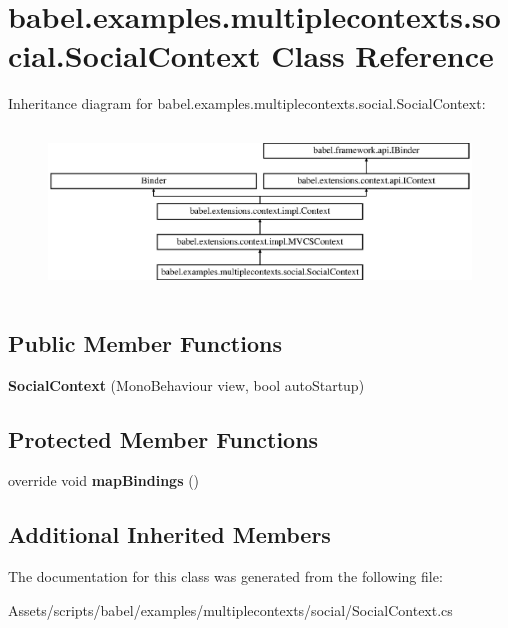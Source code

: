 \hypertarget{classbabel_1_1examples_1_1multiplecontexts_1_1social_1_1_social_context}{\section{babel.\-examples.\-multiplecontexts.\-social.\-Social\-Context Class Reference}
\label{classbabel_1_1examples_1_1multiplecontexts_1_1social_1_1_social_context}
}
Inheritance diagram for babel.\-examples.\-multiplecontexts.\-social.\-Social\-Context\-:\begin{figure}[H]
\begin{center}
\leavevmode
\includegraphics[height=4.416404cm]{classbabel_1_1examples_1_1multiplecontexts_1_1social_1_1_social_context}
\end{center}
\end{figure}
\subsection*{Public Member Functions}
\begin{DoxyCompactItemize}
\item 
\hypertarget{classbabel_1_1examples_1_1multiplecontexts_1_1social_1_1_social_context_ae0b423754ed7adb7a571b83b3a751940}{{\bfseries Social\-Context} (Mono\-Behaviour view, bool auto\-Startup)}\label{classbabel_1_1examples_1_1multiplecontexts_1_1social_1_1_social_context_ae0b423754ed7adb7a571b83b3a751940}

\end{DoxyCompactItemize}
\subsection*{Protected Member Functions}
\begin{DoxyCompactItemize}
\item 
\hypertarget{classbabel_1_1examples_1_1multiplecontexts_1_1social_1_1_social_context_ab889a619838a761bab0c210fd5d31fb2}{override void {\bfseries map\-Bindings} ()}\label{classbabel_1_1examples_1_1multiplecontexts_1_1social_1_1_social_context_ab889a619838a761bab0c210fd5d31fb2}

\end{DoxyCompactItemize}
\subsection*{Additional Inherited Members}


The documentation for this class was generated from the following file\-:\begin{DoxyCompactItemize}
\item 
Assets/scripts/babel/examples/multiplecontexts/social/Social\-Context.\-cs\end{DoxyCompactItemize}
